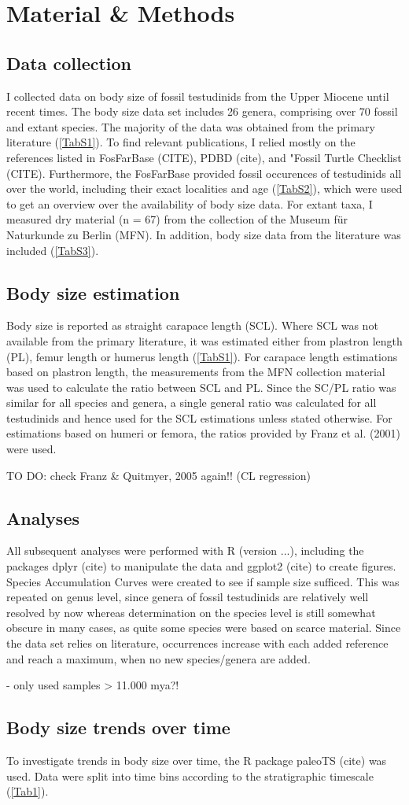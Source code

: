 \section{Material \& Methods}

\subsection{Data collection}
I collected data on body size of fossil testudinids from the Upper Miocene until recent times. The body size data set includes 26 genera, comprising over 70 fossil and extant species. The majority of the data was obtained from the primary literature (\ref{TabS1}). To find relevant publications, I relied mostly on the references listed in FosFarBase (CITE), PDBD (cite), and "Fossil Turtle Checklist (CITE).
Furthermore, the FosFarBase provided fossil occurences of testudinids all over the world, including their exact localities and age (\ref{TabS2}), which were used to get an overview over the availability of body size data. 
For extant taxa, I measured dry material (n = 67) from the collection of the Museum für Naturkunde zu Berlin (MFN). In addition, body size data from the literature was included (\ref{TabS3}).

\subsection{Body size estimation}
Body size is reported as straight carapace length (SCL). Where SCL was not available from the primary literature, it was estimated either from plastron length (PL), femur length or humerus length (\ref{TabS1}). For carapace length estimations based on plastron length, the measurements from the MFN collection material was used to calculate the ratio between SCL and PL. Since the SC/PL ratio was similar for all species and genera, a single general ratio was calculated for all testudinids and hence used for the SCL estimations unless stated otherwise. For estimations based on humeri or femora, the ratios provided by Franz et al. (2001) were used.

TO DO: check Franz \& Quitmyer, 2005 again!! (CL regression)

\subsection{Analyses}
All subsequent analyses were performed with R (version ...), including the packages dplyr (cite) to manipulate the data and ggplot2 (cite) to create figures. Species Accumulation Curves were created to see if sample size sufficed. This was repeated on genus level, since genera of fossil testudinids are relatively well resolved by now whereas determination on the species level is still somewhat obscure in many cases, as quite some species were based on scarce material. Since the data set relies on literature, occurrences increase with each added reference and reach a maximum, when no new species/genera are added.



- only used samples > 11.000 mya?!

\subsection{Body size trends over time}
To investigate trends in body size over time, the R package paleoTS (cite) was used. Data were split into time bins according to the stratigraphic timescale (\ref{Tab1}). 